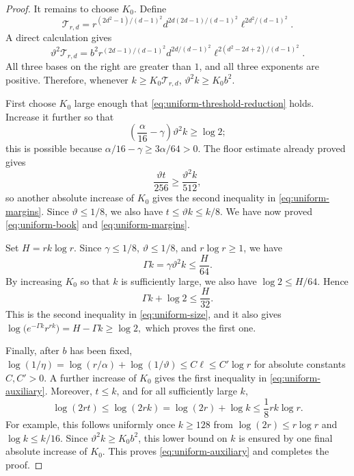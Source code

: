\documentclass[twoside,12pt]{article}
\theoremstyle{definition}
\theoremstyle{remark}
\newcommand{\1}{\mathbf 1}
\begin{document}
\begin{proof}
It remains to choose $K_0$. Define
\[
 \mathcal T_{r,d}=
 r^{(2d^2-1)/(d-1)^2}
 d^{2d(2d-1)/(d-1)^2}
 \ell^{2d^2/(d-1)^2}.
\]
A direct calculation gives
\[
 \vartheta^2\mathcal T_{r,d}
 =b^2
 r^{(2d-1)/(d-1)^2}
 d^{2d/(d-1)^2}
 \ell^{2(d^2-2d+2)/(d-1)^2}.
\]
All three bases on the right are greater than $1$, and all three exponents
are positive. Therefore, whenever $k\ge K_0\mathcal T_{r,d}$,
$
 \vartheta^2k\ge K_0b^2.
$

First choose $K_0$ large enough that
\eqref{eq:uniform-threshold-reduction} holds. Increase it further so that
\[
 \left(\frac{\alpha}{16}-\gamma\right)\vartheta^2k\ge\log2;
\]
this is possible because
$\alpha/16-\gamma\ge3\alpha/64>0$. The floor estimate already proved gives
\[
 \frac{\vartheta t}{256}
 \ge\frac{\vartheta^2k}{512},
\]
so another absolute increase of $K_0$ gives the second inequality in
\eqref{eq:uniform-margins}. Since $\vartheta\le1/8$, we also have
$t\le\vartheta k\le k/8$. We have now proved
\eqref{eq:uniform-book} and \eqref{eq:uniform-margins}.

Set
$
 H=rk\log r.
$
Since $\gamma\le1/8$, $\vartheta\le1/8$, and $r\log r\ge1$, we have
\[
 \Gamma k=\gamma\vartheta^2k\le\frac{H}{64}.
\]
By increasing $K_0$ so that $k$ is sufficiently large, we also have
$\log2\le H/64$. Hence
\[
 \Gamma k+\log2\le\frac{H}{32}.
\]
This is the second inequality in \eqref{eq:uniform-size}, and it also gives
$
 \log\bigl(e^{-\Gamma k}r^{rk}\bigr)
 =H-\Gamma k\ge\log2,
$
which proves the first one.

Finally, after $b$ has been fixed,
$ \log(1/\eta)
=\log(r/\alpha)+\log(1/\vartheta)
 \le C\ell\le C'\log r
$
for absolute constants $C,C'>0$. A further increase of $K_0$ gives the first
inequality in \eqref{eq:uniform-auxiliary}. Moreover, $t\le k$, and for all
sufficiently large $k$,
\[
 \log(2rt)
 \le\log(2rk)
 =\log(2r)+\log k
 \le\frac18rk\log r.
\]
For example, this follows uniformly once $k\ge128$ from
$\log(2r)\le r\log r$ and $\log k\le k/16$. Since
$\vartheta^2k\ge K_0b^2$, this lower bound on $k$ is ensured by one final
absolute increase of $K_0$. This proves \eqref{eq:uniform-auxiliary} and
completes the proof.
\end{proof}
\end{document}
